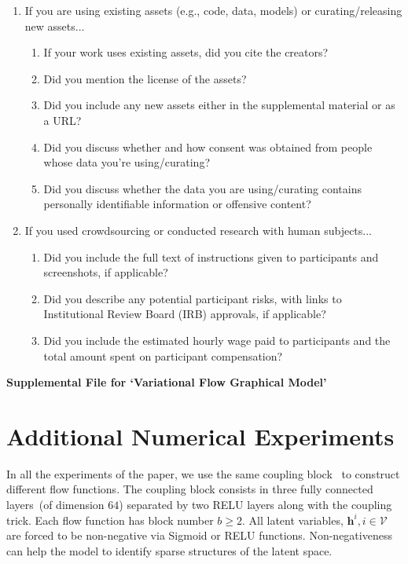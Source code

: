\documentclass{article}
\begin{document}
\begin{enumerate}
\item If you are using existing assets (e.g., code, data, models) or curating/releasing new assets...
\begin{enumerate}
  \item If your work uses existing assets, did you cite the creators?
    \answerYes{}
  \item Did you mention the license of the assets?
    \answerNo{}
  \item Did you include any new assets either in the supplemental material or as a URL?
    \answerNo{}
  \item Did you discuss whether and how consent was obtained from people whose data you're using/curating?
    \answerYes{}
  \item Did you discuss whether the data you are using/curating contains personally identifiable information or offensive content?
    \answerNA{}
\end{enumerate}

\item If you used crowdsourcing or conducted research with human subjects...
\begin{enumerate}
  \item Did you include the full text of instructions given to participants and screenshots, if applicable?
    \answerNA{}
  \item Did you describe any potential participant risks, with links to Institutional Review Board (IRB) approvals, if applicable?
    \answerNA{}
  \item Did you include the estimated hourly wage paid to participants and the total amount spent on participant compensation?
    \answerNA{}
\end{enumerate}

\end{enumerate}


\appendix
\newpage
\begin{center}
{\LARGE \textbf{Supplemental File for `Variational Flow Graphical Model'}}
\end{center}

\section{Additional Numerical Experiments}
In all the experiments of the paper, we use the same  coupling block~\cite{Dinh2016DensityEU} to construct different flow functions. 
The coupling block consists in three fully connected layers~(of dimension $64$) separated by two RELU layers along with the coupling trick. 
Each flow function has block number $b\geqslant 2$. 
All latent variables, $\mathbf{h}^{i}, i \in \mathcal{V}$ are forced to be non-negative via Sigmoid or RELU functions. 
Non-negativeness can help the model to identify sparse structures of the latent space. 
\end{document}
